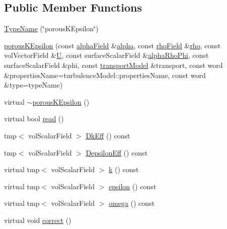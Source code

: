 \subsection*{Public Member Functions}
\begin{DoxyCompactItemize}
\item 
\hyperlink{classFoam_1_1RASModels_1_1porousKEpsilon_ac827768d33ef0e235c513e13368fb982}{Type\+Name} (\char`\"{}porous\+K\+Epsilon\char`\"{})
\item 
\hyperlink{classFoam_1_1RASModels_1_1porousKEpsilon_a0b18840a4ad8ad411da2f225c6b814cd}{porous\+K\+Epsilon} (const \hyperlink{classFoam_1_1RASModels_1_1porousKEpsilon_a06a66094f33d6817d19225445c5ea874}{alpha\+Field} \&\hyperlink{UEqn__1pl_8H_a7fe02434a19f3e00e927f32adcbb193b}{alpha}, const \hyperlink{classFoam_1_1RASModels_1_1porousKEpsilon_a1dda906cfc9022335f0782a632302cd8}{rho\+Field} \&\hyperlink{EEqn__1pl_8H_ac955f87ac2b79f02f420cae087fc52b1}{rho}, const vol\+Vector\+Field \&\hyperlink{UEqn__1pl_8H_abe23fa3afe09cc511569a7dca4160561}{U}, const surface\+Scalar\+Field \&\hyperlink{updateAlphaPhiAndInitControls__1p_8H_adb16eab5a684ddb62e40a6ffdc2d646c}{alpha\+Rho\+Phi}, const surface\+Scalar\+Field \&phi, const \hyperlink{classFoam_1_1RASModels_1_1porousKEpsilon_ac0a5dc3c45a2d1c61a649bc435a1a48a}{transport\+Model} \&transport, const word \&properties\+Name=turbulence\+Model\+::properties\+Name, const word \&type=type\+Name)
\item 
virtual \hyperlink{classFoam_1_1RASModels_1_1porousKEpsilon_afd360d5ee4b08516124a1bc7d5411d90}{$\sim$porous\+K\+Epsilon} ()
\item 
virtual bool \hyperlink{classFoam_1_1RASModels_1_1porousKEpsilon_af816873151ddb0126e98bb2f914d8ed5}{read} ()
\item 
tmp$<$ vol\+Scalar\+Field $>$ \hyperlink{classFoam_1_1RASModels_1_1porousKEpsilon_a1faa4b448524c4de622637dc51aa4a30}{Dk\+Eff} () const
\item 
tmp$<$ vol\+Scalar\+Field $>$ \hyperlink{classFoam_1_1RASModels_1_1porousKEpsilon_aaeb98c07acb7524ea98bf458352bc85a}{Depsilon\+Eff} () const
\item 
virtual tmp$<$ vol\+Scalar\+Field $>$ \hyperlink{classFoam_1_1RASModels_1_1porousKEpsilon_a2cc3daa68147a9052c2b37e9ac37eca4}{k} () const
\item 
virtual tmp$<$ vol\+Scalar\+Field $>$ \hyperlink{classFoam_1_1RASModels_1_1porousKEpsilon_ad79e047917669fbb490d351478651e20}{epsilon} () const
\item 
virtual tmp$<$ vol\+Scalar\+Field $>$ \hyperlink{classFoam_1_1RASModels_1_1porousKEpsilon_a384ad699f7960a8b9686b4a5fe7f3e1a}{omega} () const
\item 
virtual void \hyperlink{classFoam_1_1RASModels_1_1porousKEpsilon_a3ae44b28050c3aa494c1d8e18cf618c1}{correct} ()
\end{DoxyCompactItemize}
